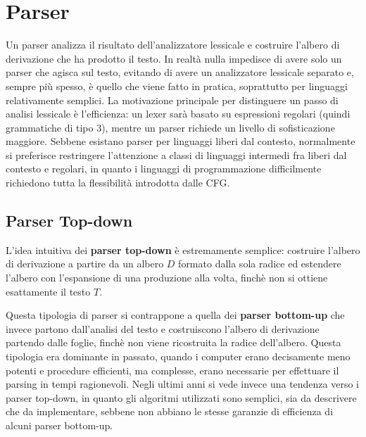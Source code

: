 \chapter{Parser}\label{cha:parser}

Un parser analizza il risultato dell'analizzatore lessicale e costruire l'albero di derivazione che ha prodotto il testo.
In realtà nulla impedisce di avere solo un parser che agisca sul testo, evitando di avere un analizzatore lessicale
separato e, sempre più spesso, è quello che viene fatto in pratica, soprattutto per linguaggi relativamente semplici.
La motivazione principale per distinguere un passo di analisi lessicale è l'efficienza: un lexer sarà basato su
espressioni regolari (quindi grammatiche di tipo 3), mentre un parser richiede un livello di sofisticazione maggiore.
Sebbene esistano parser per linguaggi liberi dal contesto, normalmente si preferisce restringere l'attenzione a classi
di linguaggi intermedi fra liberi dal contesto e regolari, in quanto i linguaggi di programmazione difficilmente
richiedono tutta la flessibilità introdotta dalle CFG.

\section{Parser Top-down}\label{sec:parser-top-down}

L'idea intuitiva dei \textbf{parser top-down} è estremamente semplice: costruire l'albero di derivazione a partire da un albero $D$ formato dalla
sola radice ed estendere l'albero con l'espansione di una produzione alla volta, finchè non si ottiene esattamente il
testo $T$.

Questa tipologia di parser si contrappone a quella dei \textbf{parser bottom-up} che invece partono dall'analisi del
testo e costruiscono l'albero di derivazione partendo dalle foglie, finchè non viene ricostruita la radice dell'albero.
Questa tipologia era dominante in passato, quando i computer erano decisamente meno potenti e procedure efficienti, ma
complesse, erano necessarie per effettuare il parsing in tempi ragionevoli.
Negli ultimi anni si vede invece una tendenza verso i parser top-down, in quanto gli algoritmi utilizzati sono semplici,
sia da descrivere che da implementare, sebbene non abbiano le stesse garanzie di efficienza di alcuni parser bottom-up.




